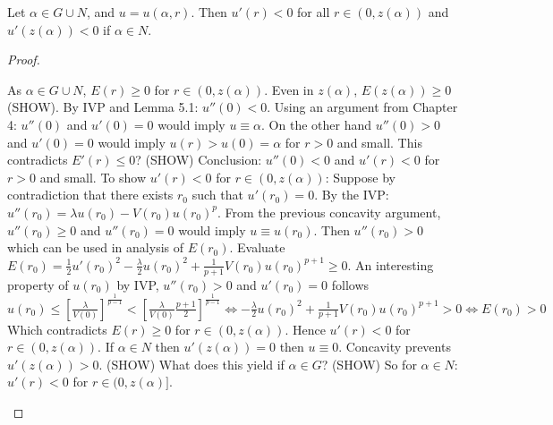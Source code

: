 \newpage
\begin{lemma}
  Let $\alpha\in G\cup N$, and $u=u(\alpha,r)$.
  Then $u'(r)<0$ for all $r\in(0,z(\alpha))$ and $u'(z(\alpha))<0$ if $\alpha\in N$.
%

% 
\begin{proof}
  \begin{outline}
    \1 As $\alpha\in G\cup N$, $E(r)\geq0$ for $r\in(0,z(\alpha))$.
    \1 Even in $z(\alpha)$, $E(z(\alpha))\geq0$ (SHOW).
    \1 By IVP and Lemma 5.1: $u''(0)<0$.
    \1 Using an argument from Chapter 4: $u''(0)$ and $u'(0)=0$ would imply $u\equiv\alpha$.
    \1 On the other hand $u''(0)>0$ and $u'(0)=0$ would imply $u(r)>u(0)=\alpha$ for $r>0$ and small.
    \1 This contradicts $E'(r)\leq0$? (SHOW)
    \1 Conclusion: $u''(0)<0$ and $u'(r)<0$ for $r>0$ and small.
    \1 To show $u'(r)<0$ for $r\in(0,z(\alpha))$:
      \2 Suppose by contradiction that there exists $r_0$ such that $u'(r_0)=0$.
      \2 By the IVP: $u''(r_0)=\lambda u(r_0)-V(r_0)u(r_0)^p$.
      \2 From the previous concavity argument, $u''(r_0)\geq0$ and $u''(r_0)=0$ would imply $u\equiv u(r_0)$.
      \2 Then $u''(r_0)>0$ which can be used in analysis of $E(r_0)$.
      \2 Evaluate $E(r_0)=\frac{1}{2}u'(r_0)^2-\frac{\lambda}{2}u(r_0)^2 + \frac{1}{p+1}V(r_0)u(r_0)^{p+1}\geq 0$.
      \2 An interesting property of $u(r_0)$ by IVP, $u''(r_0)>0$ and $u'(r_0)=0$ follows
        \3 $u(r_0)\leq\left[\frac{\lambda}{V(0)}\right]^{\frac{1}{p-1}}<
        \left[\frac{\lambda}{V(0)}\frac{p+1}{2}\right]^{\frac{1}{p-1}} \iff -\frac{\lambda}{2}u(r_0)^2+\frac{1}{p+1}V(r_0)u(r_0)^{p+1}>0 \iff E(r_0)>0$
        \3 Which contradicts $E(r)\geq0$ for $r\in(0,z(\alpha))$.
      \2 Hence $u'(r)<0$ for $r\in(0,z(\alpha))$.
    \1 If $\alpha\in N$ then $u'(z(\alpha))=0$ then $u\equiv0$.
      \2 Concavity prevents $u'(z(\alpha))>0$. (SHOW)
      \2 What does this yield if $\alpha\in G$? (SHOW)
    \1 So for $\alpha\in N$: $u'(r)<0$ for $r\in(0,z(\alpha)]$.
  \end{outline}


\end{proof}
\end{lemma}
